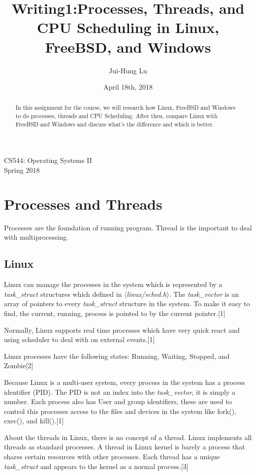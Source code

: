 \documentclass[onecolumn, draftclsnofoot,10pt, compsoc]{IEEEtran}
\title{Writing1:Processes, Threads, and CPU Scheduling in Linux, FreeBSD, and Windows}
\author{
  Jui-Hung Lu
}
\date{April 18th, 2018}
\begin{document}
\maketitle
\begin{center}
CS544: Operating Systems II \\
Spring 2018
\vspace{50 mm}
\end{center}
\begin{abstract}
In this assignment for the course, we will research how Linux, FreeBSD and Windows to do processes, threads and CPU Scheduling. After then, compare Linux with FreeBSD and Windows and discuss what's the difference and which is better.
\end{abstract}
\newpage

\section{Processes and Threads}
Processes are the foundation of running program. Thread is the important to deal with multiprocessing.

\subsection{Linux}
Linux can manage the processes in the system which is represented by a \textit{task\_struct} structures which defined in \textit{$\langle$linux/sched.h$\rangle$}. The \textit{task\_vector} is an array of pointers to every \textit{task\_struct} structure in the system. To make it easy to find, the current, running, process is pointed to by the current pointer.[1]

Normally, Linux supports real time processes which have very quick react and using scheduler to deal with on external events.[1]

Linux processes have the following states:  Running, Waiting, Stopped, and Zombie[2]

Because Linux is a multi-user system, every process in the system has a process identifier (PID). The PID is not an index into the \textit{task\_vector}, it is simply a number. Each process also has User and group identifiers, these are used to control this processes access to the files and devices in the system like fork(), exec(), and kill().[1] 

About the threads in Linux, there is no concept of a thread. Linux implements all threads as standard processes. A thread in Linux kernel is barely a process that shares certain resources with other processes. Each thread has a unique \textit{task\_struct} and appears to the kernel as a normal process.[3]
\end{document}
